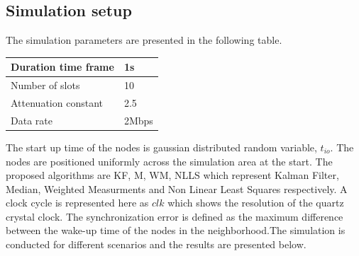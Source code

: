 \documentclass[journal]{IEEEtran}
\begin{document}
\subsection{\textbf{Simulation setup}}
The simulation parameters are presented in the following table.
\begin{center}
    \begin{tabular}{ | l | l |}
    \hline
    Duration time frame & 1s \\ \hline
    Number of slots &  10 \\ \hline
    Attenuation constant & 2.5 \\ \hline
    Data rate &  2Mbps \\ \hline
    \end{tabular}
\end{center}
The start up time of the nodes is gaussian distributed random variable, $t_{io}$. The nodes are positioned uniformly across the simulation area at the start. The proposed algorithms are KF, M, WM, NLLS which represent Kalman Filter, Median, Weighted Measurments and Non Linear Least Squares respectively. A clock cycle is represented here as $clk$ which shows the resolution of the quartz crystal clock. The synchronization error is defined as the maximum difference between the wake-up time of the nodes in the neighborhood.The simulation is conducted for different scenarios and the results are presented below.
\end{document}
